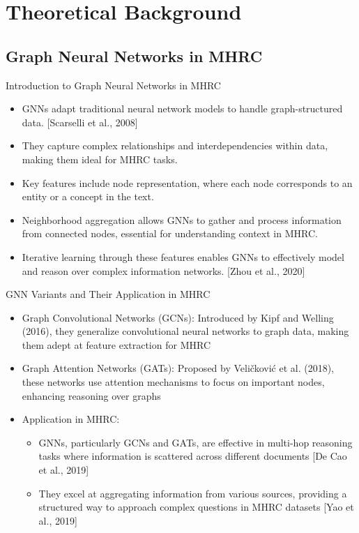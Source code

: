 \documentclass[10pt]{beamer}
\begin{document}
\section{Theoretical Background}

\subsection{Graph Neural Networks in MHRC}

\begin{frame}{Introduction to Graph Neural Networks in MHRC}
  \begin{itemize}
    \item GNNs adapt traditional neural network models to handle graph-structured data. [Scarselli et al., 2008] \cite{RN203}
    \item They capture complex relationships and interdependencies within data, making them ideal for MHRC tasks.
    \item Key features include node representation, where each node corresponds to an entity or a concept in the text.
    \item Neighborhood aggregation allows GNNs to gather and process information from connected nodes, essential for understanding context in MHRC.
    \item Iterative learning through these features enables GNNs to effectively model and reason over complex information networks. [Zhou et al., 2020] \cite{RN1}
  \end{itemize}
\end{frame}


\begin{frame}{GNN Variants and Their Application in MHRC}
  \begin{itemize}
    \item Graph Convolutional Networks (GCNs): Introduced by Kipf and Welling (2016), they generalize convolutional neural networks to graph data, making them adept at feature extraction for MHRC \cite{RN209}
    \item Graph Attention Networks (GATs): Proposed by Veličković et al. (2018), these networks use attention mechanisms to focus on important nodes, enhancing reasoning over graphs \cite{RN7}
    \item Application in MHRC: 
      \begin{itemize}
        \item GNNs, particularly GCNs and GATs, are effective in multi-hop reasoning tasks where information is scattered across different documents [De Cao et al., 2019] \cite{RN117}
        \item They excel at aggregating information from various sources, providing a structured way to approach complex questions in MHRC datasets [Yao et al., 2019]
      \end{itemize}
  \end{itemize}
\end{frame}
\end{document}
